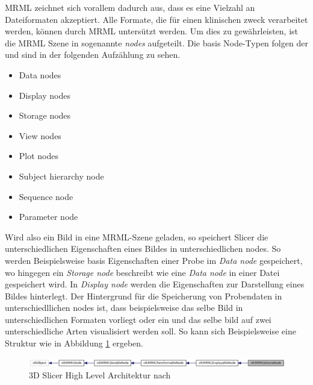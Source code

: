MRML zeichnet sich vorallem dadurch aus, dass es eine Vielzahl an Dateiformaten akzeptiert.
Alle Formate, die für einen klinischen zweck verarbeitet werden, können durch
MRML untersützt werden. Um dies zu gewährleisten, ist die MRML Szene in
sogenannte \textit{nodes} aufgeteilt. Die basis Node-Typen folgen der \citet{slicer2024}
und sind in der folgenden Aufzählung zu sehen.

\begin{minipage}{0.45\textwidth}
	\begin{itemize}
		\item Data nodes

		\item Display nodes

		\item Storage nodes

		\item View nodes
	\end{itemize}
\end{minipage}
\hfill
\begin{minipage}{0.45\textwidth}
	\begin{itemize}
		\item Plot nodes

		\item Subject hierarchy node

		\item Sequence node

		\item Parameter node
	\end{itemize}
\end{minipage}

Wird also ein Bild in eine MRML-Szene geladen, so speichert Slicer die unterschiedlichen
Eigenschaften eines Bildes in unterschiedlichen nodes. So werden Beispielsweise
basis Eigenschaften einer Probe im \textit{Data node} gespeichert, wo hingegen
ein \textit{Storage node} beschreibt wie eine \textit{Data node} in einer Datei
gespeichert wird. In \textit{Display node} werden die Eigenschaften zur
Darstellung eines Bildes hinterlegt. Der Hintergrund für die Speicherung von Probendaten
in unterschiedllichen nodes ist, dass beispielsweise das selbe Bild in
unterschiedlichen Formaten vorliegt oder ein und das selbe bild auf zwei
unterschiedliche Arten visualisiert werden soll. So kann sich Beispielsweise eine
Struktur wie in Abbildung \ref{fig:3d_slicer_class} ergeben.

\begin{figure}[h]
	\centering
	\includegraphics[width=1\textwidth]{img/slicer_class_index.jpg}
	\caption{3D Slicer High Level Architektur nach \citet{slicer2024}}
	\label{fig:3d_slicer_class}
\end{figure}

